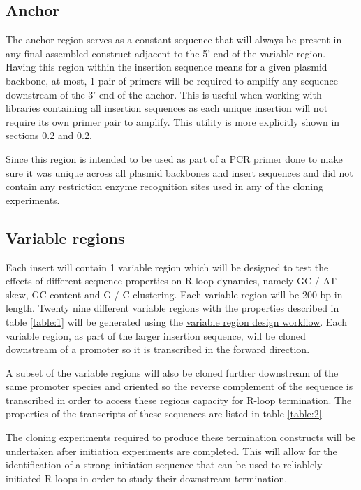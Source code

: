 \documentclass[11pt]{article}
\begin{document}
\subsection{Anchor}

The anchor region serves as a constant sequence that will always be present in any final assembled construct adjacent to the 5' end of the variable region. Having this region within the insertion sequence means for a given plasmid backbone, at most, 1 pair of primers will be required to amplify any sequence downstream of the 3' end of the anchor. This is useful when working with libraries containing all insertion sequences as each unique insertion will not require its own primer pair to amplify. This utility is more explicitly shown in sections \ref{} and \ref{}. 

Since this region is intended to be used as part of a PCR primer done to make sure it was unique across all plasmid backbones and insert sequences and did not contain any restriction enzyme recognition sites used in any of the cloning experiments. 

\subsection{Variable regions}

Each insert will contain 1 variable region which will be designed to test the effects of different sequence properties on R-loop dynamics, namely GC / AT skew, GC content and G / C clustering. Each variable region will be 200 bp in length. Twenty nine different variable regions with the properties described in table \ref{table:1} will be generated using the \href{https://github.com/EthanHolleman/plasmid-VR-design}{variable region design workflow}. Each variable region, as part of the larger insertion sequence, will be cloned downstream of a promoter so it is transcribed in the forward direction. 



A subset of the variable regions will also be cloned further downstream of the same promoter species and oriented so the reverse complement of the sequence is transcribed in order to access these regions capacity for R-loop termination. The properties of the transcripts of these sequences are listed in table \ref{table:2}. 



The cloning experiments required to produce these termination constructs will be undertaken after initiation experiments are completed. This will allow for the identification of a strong initiation sequence that can be used to reliablely initiated R-loops in order to study their downstream termination. 
\end{document}
